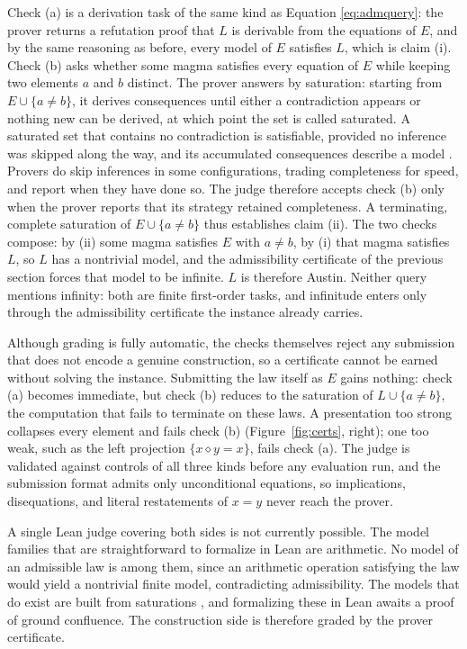 \documentclass[letterpaper]{article} %
\newcommand{\op}{\diamond}
\begin{document}
Check (a) is a derivation task of the same kind as Equation \eqref{eq:admquery}: the prover returns a refutation proof that $L$ is derivable from the equations of $E$, and by the same reasoning as before, every model of $E$ satisfies $L$, which is claim (i). Check (b) asks whether some magma satisfies every equation of $E$ while keeping two elements $a$ and $b$ distinct. The prover answers by saturation: starting from $E \cup \{a \neq b\}$, it derives consequences until either a contradiction appears or nothing new can be derived, at which point the set is called saturated. A saturated set that contains no contradiction is satisfiable, provided no inference was skipped along the way, and its accumulated consequences describe a model \citep{bachmair1994rewrite}. Provers do skip inferences in some configurations, trading completeness for speed, and report when they have done so. The judge therefore accepts check (b) only when the prover reports that its strategy retained completeness. A terminating, complete saturation of $E \cup \{a \neq b\}$ thus establishes claim (ii). The two checks compose: by (ii) some magma satisfies $E$ with $a \neq b$, by (i) that magma satisfies $L$, so $L$ has a nontrivial model, and the admissibility certificate of the previous section forces that model to be infinite. $L$ is therefore Austin. Neither query mentions infinity: both are finite first-order tasks, and infinitude enters only through the admissibility certificate the instance already carries.

Although grading is fully automatic, the checks themselves reject any submission that does not encode a genuine construction, so a certificate cannot be earned without solving the instance. Submitting the law itself as $E$ gains nothing: check (a) becomes immediate, but check (b) reduces to the saturation of $L \cup \{a \neq b\}$, the computation that fails to terminate on these laws. A presentation too strong collapses every element and fails check (b) (Figure~\ref{fig:certs}, right); one too weak, such as the left projection $\{x \op y = x\}$, fails check (a). The judge is validated against controls of all three kinds before any evaluation run, and the submission format admits only unconditional equations, so implications, disequations, and literal restatements of $x = y$ never reach the prover.

A single Lean judge covering both sides is not currently possible. The model families that are straightforward to formalize in Lean are arithmetic. No model of an admissible law is among them, since an arithmetic operation satisfying the law would yield a nontrivial finite model, contradicting admissibility. The models that do exist are built from saturations \citep{janota2026case}, and formalizing these in Lean awaits a proof of ground confluence. The construction side is therefore graded by the prover certificate.
\end{document}

